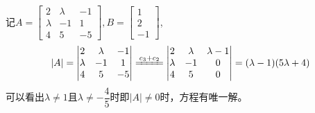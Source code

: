 \documentclass{article}
\begin{document}
\begin{jie}
记$A=
\begin{bmatrix}
 2&\lambda &-1\\
 \lambda &-1&1\\
 4& 5 &-5
\end{bmatrix}
,B=\begin{bmatrix}
     1 \\ 2\\ -1
   \end{bmatrix}$,
   \begin{equation*}
   |A|=
   \begin{vmatrix}
    2&\lambda &-1\\
 \lambda &-1&1\\
 4& 5 &-5
   \end{vmatrix}
   \xlongequal{c_{3}+c_{2}}
  \begin{vmatrix}
    2&\lambda &\lambda-1\\
 \lambda &-1&0\\
 4& 5 &0
   \end{vmatrix}  =(\lambda-1)(5\lambda+4)
   \end{equation*}
   可以看出$\lambda\neq1$且$\lambda\neq-\dfrac{4}{5}$时即$|A|\neq0$时，方程有唯一解。


\end{jie}
\end{document}
